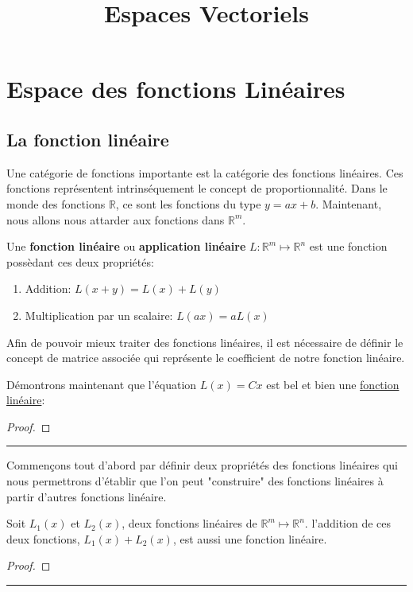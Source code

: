 \documentclass[12pt]{report}
\title{Espaces Vectoriels}
\let\Bbb\mathbb
\theoremstyle{definition}
\newenvironment{preuve}{\renewcommand{\proofname}{Preuve}\begin{proof}}{\end{proof}\noindent\textcolor[RGB]{220,220,220}{\rule{\textwidth}{1pt}}}
\begin{document}
\chapter{Espace des fonctions Linéaires}
\section{La fonction linéaire}
    Une catégorie de fonctions importante est la catégorie des fonctions linéaires.
    Ces fonctions représentent intrinséquement le concept de proportionnalité. Dans 
    le monde des fonctions $\Bbb R$, ce sont les fonctions du type $y = ax + b$. Maintenant,
    nous allons nous attarder aux fonctions dans $\Bbb R^m$.
    \begin{defi}
        \label{def:fonction_lineaire}
        Une \textbf{fonction linéaire} ou \textbf{application linéaire} $L: \Bbb R^m \mapsto \Bbb R^n$ est une fonction possèdant
        ces deux propriétés:
        \begin{enumerate}
            \setlength{\itemsep}{0pt}
            \item Addition: $L(x + y) = L(x) + L(y)$
            \item Multiplication par un scalaire: $L(ax) = aL(x)$
        \end{enumerate}
    \end{defi}
    Afin de pouvoir mieux traiter des fonctions linéaires, il est nécessaire
    de définir le concept de matrice associée qui représente le coefficient de notre 
    fonction linéaire.
    \begin{defi}
        \label{def:matrice_associee}
    \end{defi}
    Démontrons maintenant que l'équation $L(x) = Cx$ est bel et bien une \hyperref[def:fonction_lineaire]{fonction linéaire}:
    \begin{preuve}
    \end{preuve}
    Commençons tout d'abord par définir deux propriétés des fonctions linéaires qui nous 
    permettrons d'établir que l'on peut "construire" des fonctions linéaires à partir 
    d'autres fonctions linéaire.
    \begin{prop}
        \label{thm:addition_fonction_lineaire}
        Soit $L_1(x)$ et $L_2(x)$, deux fonctions linéaires de $\Bbb R^m \mapsto \Bbb R^n$.
        l'addition de ces deux fonctions, $L_1(x) + L_2(x)$, est aussi une fonction linéaire.
    \end{prop}
    \begin{preuve}
    \end{preuve}
    
\end{document}

